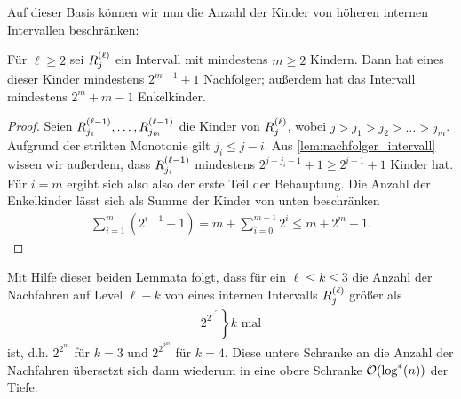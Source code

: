 Auf dieser Basis können wir nun die Anzahl der Kinder von höheren internen Intervallen beschränken:
\begin{lemma}
    Für $\ell \ge 2$ sei $R^{(\ell)}_{j}$ ein Intervall mit mindestens $m \ge 2$ Kindern.
    Dann hat eines dieser Kinder mindestens $2^{m-1}+1$ Nachfolger; außerdem hat das Intervall mindestens $2^m + m - 1$ Enkelkinder.
\end{lemma}
\begin{proof}
    Seien $R^{(\ell - 1)}_{j_1}, \ldots, R^{(\ell - 1)}_{j_m}$ die Kinder von $R^{(\ell)}_{j}$, wobei $j > j_1 > j_2 > \ldots > j_m$.
    Aufgrund der strikten Monotonie gilt $j_i \le j - i$.
    Aus \cref{lem:nachfolger_intervall} wissen wir außerdem, dass $R^{(\ell-1)}_{j_i}$ mindestens $2^{j - j_i - 1} + 1 \ge 2^{i-1} + 1$ Kinder hat.
    Für $i = m$ ergibt sich also also der erste Teil der Behauptung.
    Die Anzahl der Enkelkinder lässt sich als Summe der Kinder von unten beschränken
    \begin{align}
        \sum_{i=1}^m (2^{i-1} + 1) = m + \sum_{i=0}^{m-1} 2^i \le m + 2^m - 1.
    \end{align}
\end{proof}

Mit Hilfe dieser beiden Lemmata folgt, dass für ein $\ell \le k \le 3$ die Anzahl der Nachfahren auf Level $\ell -k$ von eines internen Intervalls $R^{(\ell)}_{j}$ größer als
\def\rddots#1{\cdot^{\cdot^{\cdot^{#1}}}}
\begin{align}
    \left. 2^{2^{\rddots{2^m}}} \right\} \text{$k$ mal}
\end{align}
ist, d.h. $2^{2^m}$ für $k=3$ und $2^{2^{2^m}}$ für $k=4$.
Diese untere Schranke an die Anzahl der Nachfahren übersetzt sich dann wiederum in eine obere Schranke $\mathcal{O}\!\left(\log^*(n)\right)$ der Tiefe.